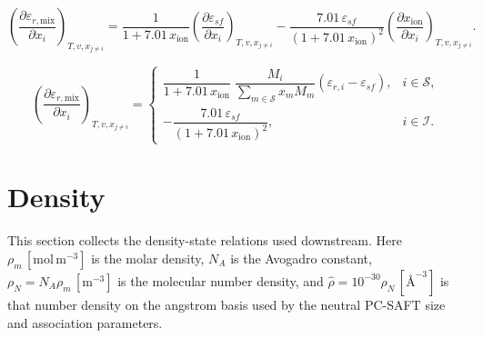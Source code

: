 \documentclass[12pt, letterpaper]{article}
\begin{document}

\begin{equation}
    \left(\frac{\partial \varepsilon_{r,\mathrm{mix}}}{\partial x_{i}}\right)_{T,v,x_{j\neq i}}
    =
    \frac{1}{1+7.01\,x_{\mathrm{ion}}}
    \left(\frac{\partial \varepsilon_{sf}}{\partial x_{i}}\right)_{T,v,x_{j\neq i}}
    -\frac{7.01\,\varepsilon_{sf}}{\left(1+7.01\,x_{\mathrm{ion}}\right)^2}
    \left(\frac{\partial x_{\mathrm{ion}}}{\partial x_{i}}\right)_{T,v,x_{j\neq i}} .
    \label{eq:depsr_mix_dxi}
\end{equation}


\begin{equation}
    \left(\frac{\partial \varepsilon_{r,\mathrm{mix}}}{\partial x_{i}}\right)_{T,v,x_{j\neq i}}
    =
    \begin{cases}
        \dfrac{1}{1+7.01\,x_{\mathrm{ion}}}\;
        \dfrac{M_{i}}{\displaystyle \sum_{m\in\mathcal{S}} x_{m} M_{m}}
        \left(\varepsilon_{r,i}-\varepsilon_{sf}\right),
         & i\in\mathcal{S}, \\[14pt]
        -\dfrac{7.01\,\varepsilon_{sf}}{\left(1+7.01\,x_{\mathrm{ion}}\right)^{2}},
         & i\in\mathcal{I}.
    \end{cases}
    \label{eq:depsr_mix_dxi_piecewise}
\end{equation}

\section{Density}
\label{sec:initial_density_solve}

This section collects the density-state relations used downstream. Here \(\rho_m\,[\mathrm{mol\,m^{-3}}]\) is the molar density, \(N_A\) is the Avogadro constant, \(\rho_N=N_A\rho_m\,[\mathrm{m^{-3}}]\) is the molecular number density, and \(\hat{\rho}=10^{-30}\rho_N\,[\text{\AA}^{-3}]\) is that number density on the angstrom basis used by the neutral PC-SAFT size and association parameters.
\end{document}
